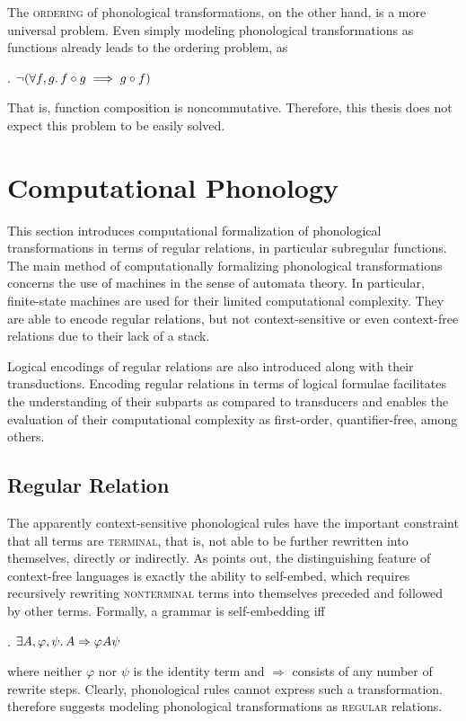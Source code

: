 \documentclass[12pt, a4paper]{report}
\newcommand{\textterm}[1]{\textsc{#1}\index{#1}}
\begin{document}
The \textterm{ordering} of phonological transformations, on the other
hand, is a more universal problem.  Even simply modeling phonological
transformations as functions already leads to the ordering problem, as

\ex. \(\neg(\forall f, g\ldotp f \circ g \implies g \circ f)\)

That is, function composition is noncommutative.  Therefore, this
thesis does not expect this problem to be easily solved.

\section{Computational Phonology}
This section introduces computational formalization of phonological
transformations in terms of regular relations, in particular
subregular functions.  The main method of computationally formalizing
phonological transformations concerns the use of machines in the sense
of automata theory.  In particular, finite-state machines are used for
their limited computational complexity.  They are able to encode
regular relations, but not context-sensitive or even context-free
relations due to their lack of a stack.

Logical encodings of regular relations are also introduced along with
their transductions.  Encoding regular relations in terms of logical
formulae facilitates the understanding of their subparts as compared
to transducers and enables the evaluation of their computational
complexity as first-order, quantifier-free, among others.

\subsection{Regular Relation}
The apparently context-sensitive phonological rules have the important
constraint that all terms are \textterm{terminal}, that is, not able
to be further rewritten into themselves, directly or indirectly.  As
\textcite{c59cfpg} points out, the distinguishing feature of
context-free languages is exactly the ability to self-embed, which
requires recursively rewriting \textterm{nonterminal} terms into
themselves preceded and followed by other terms.  Formally, a grammar
is self-embedding iff

\ex. \(\exists A, \varphi, \psi\ldotp A \Rightarrow \varphi A \psi\)

where neither \(\varphi\) nor \(\psi\) is the identity term and
\(\Rightarrow\) consists of any number of rewrite steps.  Clearly,
phonological rules cannot express such a transformation.
\textcite{kk94rmprs} therefore suggests modeling phonological
transformations as \textterm{regular} relations.
\end{document}
